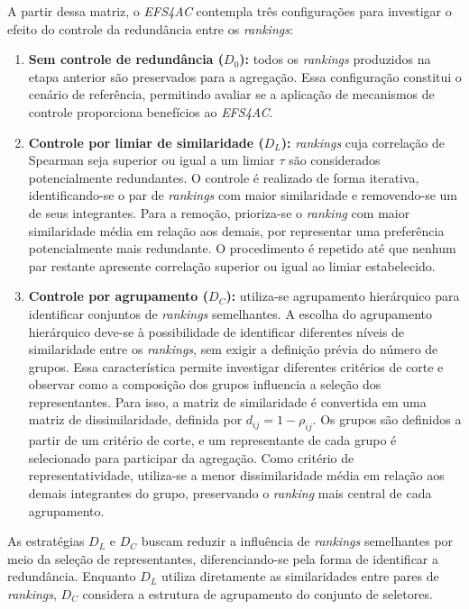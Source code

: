 A partir dessa matriz, o \textit{EFS4AC} contempla três configurações para investigar o efeito do controle da redundância entre os \textit{rankings}:
\begin{enumerate}
    \item \textbf{Sem controle de redundância ($D_0$):} todos os \textit{rankings} produzidos na etapa anterior são preservados para a agregação. Essa configuração constitui o cenário de referência, permitindo avaliar se a aplicação de mecanismos de controle proporciona benefícios ao \textit{EFS4AC}.

    \item \textbf{Controle por limiar de similaridade ($D_L$):} \textit{rankings} cuja correlação de Spearman seja superior ou igual a um limiar $\tau$ são considerados potencialmente redundantes. O controle é realizado de forma iterativa, identificando-se o par de \textit{rankings} com maior similaridade e removendo-se um de seus integrantes. Para a remoção, prioriza-se o \textit{ranking} com maior similaridade média em relação aos demais, por representar uma preferência potencialmente mais redundante. O procedimento é repetido até que nenhum par restante apresente correlação superior ou igual ao limiar estabelecido.

    \item \textbf{Controle por agrupamento ($D_C$):} utiliza-se agrupamento hierárquico para identificar conjuntos de \textit{rankings} semelhantes. A escolha do agrupamento hierárquico deve-se à possibilidade de identificar diferentes níveis de similaridade entre os \textit{rankings}, sem exigir a definição prévia do número de grupos. Essa característica permite investigar diferentes critérios de corte e observar como a composição dos grupos influencia a seleção dos representantes. Para isso, a matriz de similaridade é convertida em uma matriz de dissimilaridade, definida por $d_{ij}=1-\rho_{ij}$. Os grupos são definidos a partir de um critério de corte, e um representante de cada grupo é selecionado para participar da agregação. Como critério de representatividade, utiliza-se a menor dissimilaridade média em relação aos demais integrantes do grupo, preservando o \textit{ranking} mais central de cada agrupamento.
\end{enumerate}

As estratégias $D_L$ e $D_C$ buscam reduzir a influência de \textit{rankings} semelhantes por meio da seleção de representantes, diferenciando-se pela forma de identificar a redundância. Enquanto $D_L$ utiliza diretamente as similaridades entre pares de \textit{rankings}, $D_C$ considera a estrutura de agrupamento do conjunto de seletores.

